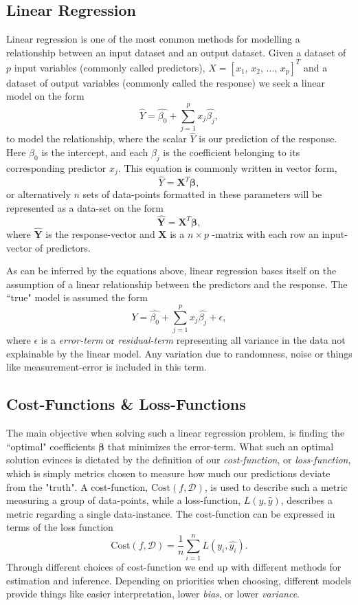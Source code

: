 \subsection{Linear Regression}
Linear regression is one of the most common methods for modelling a relationship between an input dataset and an output dataset.
Given a dataset of $p$ input variables (commonly called predictors), $X=[x_1, \, x_2, \, \ldots, \, x_p]^T$ and a dataset of output variables (commonly called the response) we seek a linear model on the form
\[
\hat{Y}=\hat{\beta_0}+\sum_{j=1}^{p}x_j\hat{\beta_j},
\]
to model the relationship, where the scalar $\hat{Y}$ is our prediction of the response. 
Here $\beta_0$ is the intercept, and each $\beta_j$ is the coefficient belonging to its corresponding predictor $x_j$. 
This equation is commonly written in vector form, 
\[
\hat{Y}=\boldsymbol{X}^T\boldsymbol{\beta},
\]
or alternatively $n$ sets of data-points formatted in these parameters will be represented as a data-set on the form
\[
\boldsymbol{\hat{Y}}=\boldsymbol{X}^T\boldsymbol{\beta},
\]
where $\boldsymbol{\hat{Y}}$ is the response-vector and $\boldsymbol{X}$ is a $n\times p$ -matrix with each row an input-vector of predictors.


As can be inferred by the equations above, linear regression bases itself on the assumption of a linear relationship between the predictors and the response.
The ``true" model is assumed the form 
\[
Y=\hat{\beta_0}+\sum_{j=1}^{p}x_j\hat{\beta_j}+\epsilon,
\]
where $\epsilon$ is a \textit{error-term} or \textit{residual-term} representing all variance in the data not explainable by the linear model. 
Any variation due to randomness, noise or things like measurement-error is included in this term. 
\subsection{Cost-Functions \& Loss-Functions}
The main objective when solving such a linear regression problem, is finding the ``optimal" coefficients $\boldsymbol{\beta}$ that minimizes the error-term. 
What such an optimal solution evinces is dictated by the definition of our \textit{cost-function},  or \textit{loss-function}, which is simply metrics chosen to measure how much our predictions deviate from the "truth". 
A cost-function, $\text{Cost}(f,\mathcal{D} )$, is used to describe such a metric measuring a group of data-points, while a loss-function, $L(y, \hat{y})$, describes a metric regarding a single data-instance. 
The cost-function can be expressed in terms of the loss function
\[
\text{Cost}(f,\mathcal{D}) = \frac{1}{n}\sum_{i=1}^n L(y_i, \hat{y_i}).
\]
Through different choices of cost-function we end up with different methods for estimation and inference. 
Depending on priorities when choosing, different models provide things like easier interpretation, lower \textit{bias}, or lower \textit{variance}.

